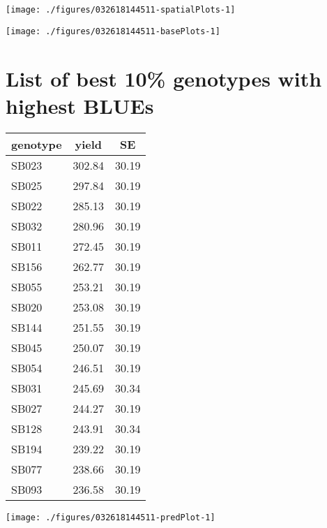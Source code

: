 \documentclass[a4paper,11pt]{article}\usepackage[]{graphicx}\usepackage[]{color}
\newenvironment{knitrout}{}{} %
\begin{document}
\texttt{[image: ./figures/032618144511-spatialPlots-1]} 

\begin{knitrout}
\color{fgcolor}
\texttt{[image: ./figures/032618144511-basePlots-1]} 

\end{knitrout}
\newpage

\section{List of best 10\% genotypes with
highest BLUEs}

\begin{multicols*}{2}
\begin{tabular}{lcc}
  \hline
genotype & yield & SE \\ 
  \hline
SB023 & 302.84 & 30.19 \\ 
  SB025 & 297.84 & 30.19 \\ 
  SB022 & 285.13 & 30.19 \\ 
  SB032 & 280.96 & 30.19 \\ 
  SB011 & 272.45 & 30.19 \\ 
  SB156 & 262.77 & 30.19 \\ 
  SB055 & 253.21 & 30.19 \\ 
  SB020 & 253.08 & 30.19 \\ 
  SB144 & 251.55 & 30.19 \\ 
  SB045 & 250.07 & 30.19 \\ 
  SB054 & 246.51 & 30.19 \\ 
  SB031 & 245.69 & 30.34 \\ 
  SB027 & 244.27 & 30.19 \\ 
  SB128 & 243.91 & 30.34 \\ 
  SB194 & 239.22 & 30.19 \\ 
  SB077 & 238.66 & 30.19 \\ 
  SB093 & 236.58 & 30.19 \\ 
   \hline
\end{tabular}

\columnbreak
\begin{knitrout}
\color{fgcolor}
\texttt{[image: ./figures/032618144511-predPlot-1]} 

\end{knitrout}
\end{multicols*}
\end{document}
